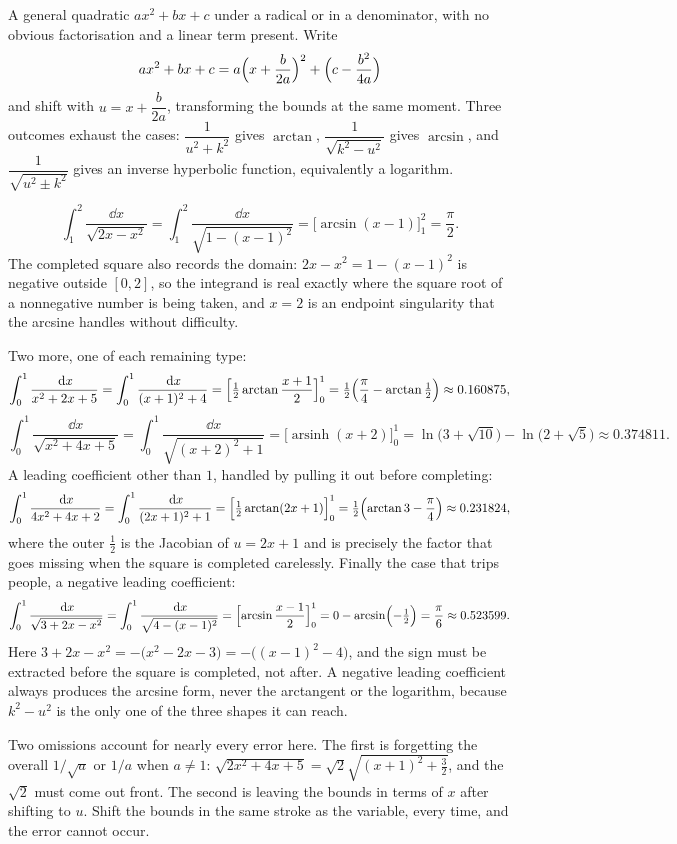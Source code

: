 \cue A general quadratic $ax^2+bx+c$ under a radical or in a denominator, with no obvious factorisation and a linear term present.
\method Write
\[
ax^2+bx+c=a\Bigl(x+\frac{b}{2a}\Bigr)^2+\Bigl(c-\frac{b^2}{4a}\Bigr)
\]
and shift with $u=x+\dfrac{b}{2a}$, transforming the bounds at the same moment. Three outcomes exhaust the cases: $\dfrac{1}{u^2+k^2}$ gives $\arctan$, $\dfrac{1}{\sqrt{k^2-u^2}}$ gives $\arcsin$, and $\dfrac{1}{\sqrt{u^2\pm k^2}}$ gives an inverse hyperbolic function, equivalently a logarithm.

\begin{worked}
\[
\int_1^2\frac{\dd x}{\sqrt{2x-x^2}}=\int_1^2\frac{\dd x}{\sqrt{1-(x-1)^2}}=\bigl[\arcsin(x-1)\bigr]_1^2=\frac{\pi}{2}.
\]
The completed square also records the domain: $2x-x^2=1-(x-1)^2$ is negative outside $[0,2]$, so the integrand is real exactly where the square root of a nonnegative number is being taken, and $x=2$ is an endpoint singularity that the arcsine handles without difficulty.

Two more, one of each remaining type:
\[
\int_0^1\frac{\,\mathrm{d} x}{x^2+2x+5}=\int_0^1\frac{\,\mathrm{d} x}{(x+1)^2+4}=\Bigl[\tfrac12\arctan\frac{x+1}{2}\Bigr]_0^1=\tfrac12\Bigl(\frac{\pi}{4}-\arctan\tfrac12\Bigr)\approx0.160875 ,
\]
\[
\int_0^1\frac{\dd x}{\sqrt{x^2+4x+5}}=\int_0^1\frac{\dd x}{\sqrt{(x+2)^2+1}}=\bigl[\operatorname{arsinh}(x+2)\bigr]_0^1=\ln\bigl(3+\sqrt{10}\bigr)-\ln\bigl(2+\sqrt5\bigr)\approx0.374811 .
\]
A leading coefficient other than $1$, handled by pulling it out before completing:
\[
\int_0^1\frac{\,\mathrm{d} x}{4x^2+4x+2}=\int_0^1\frac{\,\mathrm{d} x}{(2x+1)^2+1}=\Bigl[\tfrac12\arctan(2x+1)\Bigr]_0^1=\tfrac12\Bigl(\arctan3-\frac{\pi}{4}\Bigr)\approx0.231824 ,
\]
where the outer $\tfrac12$ is the Jacobian of $u=2x+1$ and is precisely the factor that goes missing when the square is completed carelessly. Finally the case that trips people, a negative leading coefficient:
\[
\int_0^1\frac{\,\mathrm{d} x}{\sqrt{3+2x-x^2}}=\int_0^1\frac{\,\mathrm{d} x}{\sqrt{4-(x-1)^2}}
=\Bigl[\arcsin\frac{x-1}{2}\Bigr]_0^1=0-\arcsin\Bigl(-\tfrac12\Bigr)=\frac{\pi}{6}\approx0.523599 .
\]
Here $3+2x-x^2=-\bigl(x^2-2x-3\bigr)=-\bigl((x-1)^2-4\bigr)$, and the sign must be extracted before the square is completed, not after. A negative leading coefficient always produces the arcsine form, never the arctangent or the logarithm, because $k^2-u^2$ is the only one of the three shapes it can reach.
\end{worked}

\begin{trap}
Two omissions account for nearly every error here. The first is forgetting the overall $1/\sqrt a$ or $1/a$ when $a\neq1$: $\sqrt{2x^2+4x+5}=\sqrt2\sqrt{(x+1)^2+\tfrac32}$, and the $\sqrt2$ must come out front. The second is leaving the bounds in terms of $x$ after shifting to $u$. Shift the bounds in the same stroke as the variable, every time, and the error cannot occur.
\end{trap}

